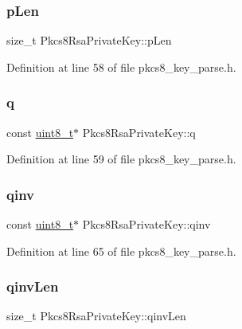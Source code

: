 \subsubsection{\texorpdfstring{p\+Len}{pLen}}
{\footnotesize\ttfamily size\+\_\+t Pkcs8\+Rsa\+Private\+Key\+::p\+Len}



Definition at line 58 of file pkcs8\+\_\+key\+\_\+parse.\+h.

\mbox{\label{structPkcs8RsaPrivateKey_a129f4bc46975ed98556bc42c75151782}} 
\subsubsection{\texorpdfstring{q}{q}}
{\footnotesize\ttfamily const \hyperlink{stdint_8h_aba7bc1797add20fe3efdf37ced1182c5}{uint8\+\_\+t}$\ast$ Pkcs8\+Rsa\+Private\+Key\+::q}



Definition at line 59 of file pkcs8\+\_\+key\+\_\+parse.\+h.

\mbox{\label{structPkcs8RsaPrivateKey_a573ca0ff349e3265efcfdebda8442cc4}} 
\subsubsection{\texorpdfstring{qinv}{qinv}}
{\footnotesize\ttfamily const \hyperlink{stdint_8h_aba7bc1797add20fe3efdf37ced1182c5}{uint8\+\_\+t}$\ast$ Pkcs8\+Rsa\+Private\+Key\+::qinv}



Definition at line 65 of file pkcs8\+\_\+key\+\_\+parse.\+h.

\mbox{\label{structPkcs8RsaPrivateKey_a7e17613233cfc76c147bcf432f30488c}} 
\subsubsection{\texorpdfstring{qinv\+Len}{qinvLen}}
{\footnotesize\ttfamily size\+\_\+t Pkcs8\+Rsa\+Private\+Key\+::qinv\+Len}



